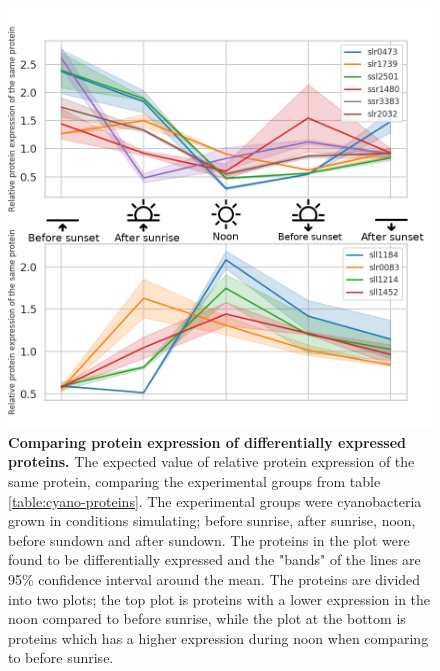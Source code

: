 \begin{figure}[H]
  \begin{center}
  \includegraphics[width=\linewidth]{results/combined_edited.png}
  \caption{\textbf{Comparing protein expression of differentially expressed proteins.} The expected value of relative protein expression of the same protein, comparing the experimental groups from table \ref{table:cyano-proteins}. The experimental groups were cyanobacteria grown in conditions simulating; before sunrise, after sunrise, noon, before sundown and after sundown. The proteins in the plot were found to be differentially expressed and the "bands" of the lines are 95\% confidence interval around the mean. The proteins are divided into two plots; the top plot is proteins with a lower expression in the noon compared to before sunrise, while the plot at the bottom is proteins which has a higher expression during noon when comparing to before sunrise.}
  \label{fig:expression}
  \end{center}
\end{figure}
